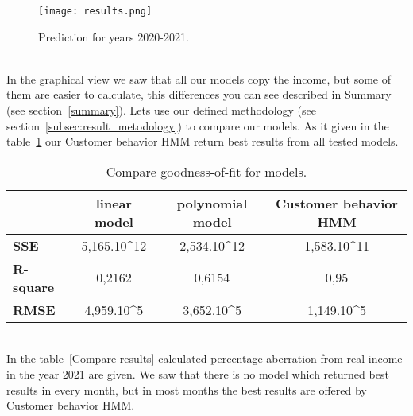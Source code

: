 \begin{figure}[h!]
    \begin{center}
        \texttt{[image: results.png]}
    \end{center}
    \caption{Prediction for years 2020-2021.}
    \label{results}
\end{figure}\\
In the graphical view we saw that all our models copy the income, but some of them are easier to calculate, this differences you can see described in Summary (see section~\ref{summary}).
Lets use our defined methodology (see section~\ref{subsec:result_metodology}) to compare our models.
As it given in the table~\ref{compare} our Customer behavior HMM return best results from all tested models.
\begin{table}[h!]
    \begin{center}
        \begin{tabular}{ | l | c | c | c |}
            \hline
            & \textbf{linear model} & \textbf{polynomial model} & \textbf{Customer behavior HMM}\\
            \hline
            \textbf{SSE} & 5,165.10^{12} & 2,534.10^{12} & 1,583.10^{11} \\
            \textbf{R-square} & 0,2162 & 0,6154 & 0,95 \\
            \textbf{RMSE} & 4,959.10^5 & 3,652.10^5 & 1,149.10^5\\
            \hline
        \end{tabular}
    \end{center}
    \caption{Compare goodness-of-fit for models.}
    \label{compare}
\end{table}\\
In the table~\ref{Compare results} calculated percentage aberration from real income in the year 2021 are given.
We saw that there is no model which returned best results in every month, but in most months the best results are offered by Customer behavior HMM.
